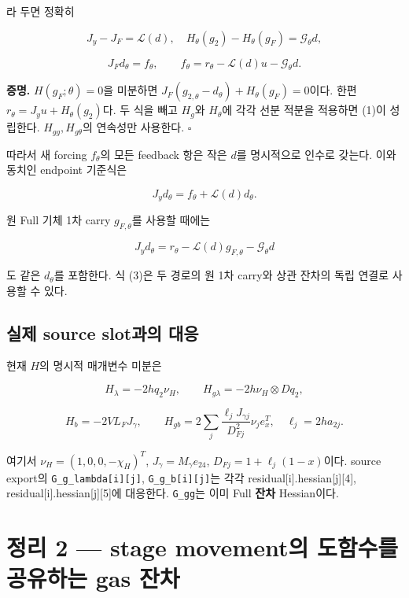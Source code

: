라 두면 정확히

\[
J_y-J_F=\mathcal L(d),\quad
H_\theta(g_2)-H_\theta(g_F)=\mathcal G_\theta d,
\]

\[
\boxed{J_Fd_\theta=f_\theta,
\qquad f_\theta=r_\theta-\mathcal L(d)u-\mathcal G_\theta d.}
\tag{1}
\]

\textbf{증명.} \(H(g_F;\theta)=0\)을 미분하면 \(J_F(g_{2,\theta}-d_\theta)+H_\theta(g_F)=0\)이다. 한편 \(r_\theta=J_yu+H_\theta(g_2)\)다. 두 식을 빼고 \(H_g\)와 \(H_\theta\)에 각각 선분 적분을 적용하면 (1)이 성립한다. \(H_{gg},H_{g\theta}\)의 연속성만 사용한다. \(\square\)

따라서 새 forcing \(f_\theta\)의 모든 feedback 항은 작은 \(d\)를 명시적으로 인수로 갖는다. 이와 동치인 endpoint 기준식은

\[
\boxed{J_yd_\theta=f_\theta+\mathcal L(d)d_\theta.}
\tag{2}
\]

원 Full 기체 1차 carry \(g_{F,\theta}\)를 사용할 때에는

\[
J_yd_\theta=r_\theta-\mathcal L(d)g_{F,\theta}-\mathcal G_\theta d
\tag{3}
\]

도 같은 \(d_\theta\)를 포함한다. 식 (3)은 두 경로의 원 1차 carry와 상관 잔차의 독립 연결로 사용할 수 있다.

\hypertarget{uxc2e4uxc81c-source-slotuxacfcuxc758-uxb300uxc751}{%
\subsection{실제 source slot과의 대응}\label{uxc2e4uxc81c-source-slotuxacfcuxc758-uxb300uxc751}}

현재 \(H\)의 명시적 매개변수 미분은

\[
H_\lambda=-2h q_2\nu_H,\qquad
H_{g\lambda}=-2h\nu_H\otimes Dq_2,
\]

\[
H_b=-2VL_FJ_\gamma,\qquad
H_{gb}=2\sum_j\frac{\ell_jJ_{\gamma j}}{D_{Fj}^2}\nu_j e_x^T,
\quad\ell_j=2ha_{2j}.
\tag{4}
\]

여기서 \(\nu_H=(1,0,0,-\chi_H)^T\), \(J_\gamma=M_\gamma e_{24}\), \(D_{Fj}=1+\ell_j(1-x)\)이다. source export의 \texttt{G\_g\_lambda{[}i{]}{[}j{]}}, \texttt{G\_g\_b{[}i{]}{[}j{]}}는 각각 residual{[}i{]}.hessian{[}j{]}{[}4{]}, residual{[}i{]}.hessian{[}j{]}{[}5{]}에 대응한다. \texttt{G\_gg}는 이미 Full \textbf{잔차} Hessian이다.

\hypertarget{uxc815uxb9ac-2-stage-movementuxc758-uxb3c4uxd568uxc218uxb97c-uxacf5uxc720uxd558uxb294-gas-uxc794uxcc28}{%
\section{정리 2 --- stage movement의 도함수를 공유하는 gas 잔차}\label{uxc815uxb9ac-2-stage-movementuxc758-uxb3c4uxd568uxc218uxb97c-uxacf5uxc720uxd558uxb294-gas-uxc794uxcc28}}

